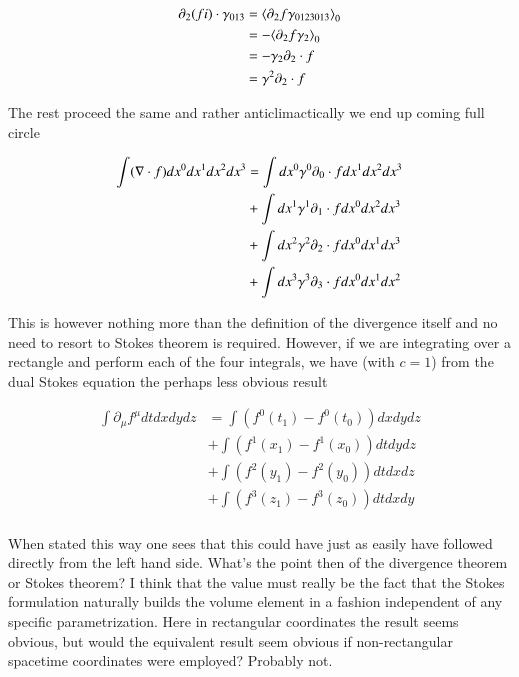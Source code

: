\begin{align*}
\partial_2 (f i) \cdot \gamma_{013}
&=
{\left\langle{{ \partial_2 f \gamma_{0123013} }}\right\rangle}_{0} \\
&=
-{\left\langle{{ \partial_2 f \gamma_{2} }}\right\rangle}_{0} \\
&=
- \gamma_2 \partial_2 \cdot f \\
&=
\gamma^2 \partial_2 \cdot f 
\end{align*}

The rest proceed the same and rather anticlimactically we end up coming full circle 

\begin{align*}
\int (\nabla \cdot f) dx^0 dx^1 dx^2 dx^3 
&=
\int dx^0 \gamma^0 \partial_0 \cdot f dx^1 dx^2 dx^3 \\
&+\int dx^1 \gamma^1 \partial_1 \cdot f dx^0 dx^2 dx^3 \\
&+\int dx^2 \gamma^2 \partial_2 \cdot f dx^0 dx^1 dx^3 \\
&+\int dx^3 \gamma^3 \partial_3 \cdot f dx^0 dx^1 dx^2 \\
\end{align*}

This is however nothing more than the definition of the divergence itself and no need to resort to Stokes theorem is required.  However, if we are integrating over a rectangle and perform each of the four integrals, we have (with $c=1$) from the dual Stokes equation the perhaps less obvious result

\begin{align*}
\int \partial_\mu f^\mu dt dx dy dz
&=
\int (f^0(t_1) - f^0(t_0)) dx dy dz \\
&+\int (f^1(x_1) - f^1(x_0)) dt dy dz \\
&+\int (f^2(y_1) - f^2(y_0)) dt dx dz \\
&+\int (f^3(z_1) - f^3(z_0)) dt dx dy \\
\end{align*}

When stated this way one sees that this could have just as easily have followed directly from the left hand side.  What's the point then of the divergence theorem or Stokes theorem?  I think that the value must really be the fact that the Stokes formulation naturally builds the volume element in a fashion independent of any specific parametrization.  Here in rectangular coordinates the result seems obvious, but would the equivalent result seem obvious if non-rectangular spacetime coordinates were employed?  Probably not.

\EndArticle
